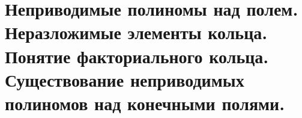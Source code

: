 \section{Неприводимые полиномы над полем. Неразложимые элементы кольца. Понятие факториального кольца. Существование
неприводимых полиномов над конечными полями.}

